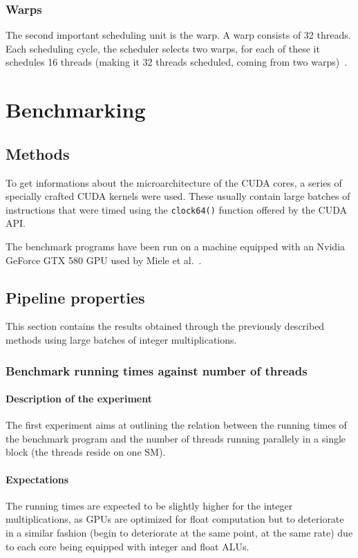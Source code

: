\documentclass{report}
\begin{document}
        \subsection{Warps}
        The second important scheduling unit is the warp. A warp consists
        of 32 threads. Each scheduling cycle, the scheduler selects two
        warps, for each of these it schedules 16 threads (making it 32
        threads scheduled, coming from two warps)~\cite{cudaprog}.

\chapter{Benchmarking}

\section{Methods}
	To get informations about the microarchitecture of the CUDA cores, a series 
    of specially crafted CUDA kernels were used. These usually contain large 
    batches of instructions that were timed using the \texttt{clock64()} 
    function offered by the CUDA API.

	The benchmark programs have been run on a machine equipped with an Nvidia
    GeForce GTX 580 GPU used by Miele et al.~\cite{cofact14}.

\section{Pipeline properties}
	This section contains the results obtained through the previously described
	methods using large batches of integer multiplications.

	\subsection{Benchmark running times against number of threads}
	\label{par:pipeline_exp}
	\subsubsection{Description of the experiment}
	The first experiment aims at outlining the relation between the running
    times of the benchmark program and the number of threads running parallely in
    a single block (the threads reside on one SM).
	\subsubsection{Expectations}
    The running times are expected to be slightly higher for the integer
    multiplications, as GPUs are optimized for float computation
    but to deteriorate in a similar fashion (begin to deteriorate
    at the same point, at the same rate) due to each core being equipped with
    integer and float ALUs.
    
\end{document}
